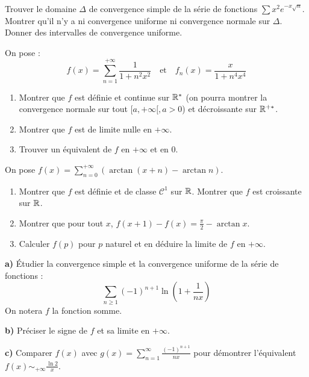 \begin{exercice}
Trouver le domaine $\Delta$ de convergence simple de la série de fonctions $\sum x^2 e^{-x\sqrt{n}}$.
Montrer qu'il n'y a ni convergence uniforme ni convergence normale sur $\Delta$.
Donner des intervalles de convergence uniforme.
\end{exercice}

\begin{exercice}
On pose :
$$ f(x) = \sum_{n=1}^{+\infty} \frac{1}{1+n^2 x^2} \quad \text{et} \quad f_n(x) = \frac{x}{1+n^4 x^4} $$
\begin{enumerate}
    \item Montrer que $f$ est définie et continue sur $\mathbb{R}^*$ (on pourra montrer la convergence normale sur tout $[a, +\infty[, a>0$) et décroissante sur $\mathbb{R}^{+*}$.
    \item Montrer que $f$ est de limite nulle en $+\infty$.
    \item Trouver un équivalent de $f$ en $+\infty$ et en $0$.
\end{enumerate}
\end{exercice}

\begin{exercice}
On pose $f(x) = \sum_{n=0}^{+\infty} (\arctan(x+n) - \arctan n)$.
\begin{enumerate}
    \item Montrer que $f$ est définie et de classe $\mathcal{C}^1$ sur $\mathbb{R}$. Montrer que $f$ est croissante sur $\mathbb{R}$.
    \item Montrer que pour tout $x$, $f(x+1) - f(x) = \frac{\pi}{2} - \arctan x$.
    \item Calculer $f(p)$ pour $p$ naturel et en déduire la limite de $f$ en $+\infty$.
\end{enumerate}
\end{exercice}

\begin{exercice}
\textbf{a)} Étudier la convergence simple et la convergence uniforme de la série de fonctions :
$$ \sum_{n\ge 1} (-1)^{n+1} \ln\left(1+\frac{1}{nx}\right) $$
On notera $f$ la fonction somme.

\textbf{b)} Préciser le signe de $f$ et sa limite en $+\infty$.

\textbf{c)} Comparer $f(x)$ avec $g(x) = \sum_{n=1}^\infty \frac{(-1)^{n+1}}{nx}$ pour démontrer l'équivalent $f(x) \sim_{+\infty} \frac{\ln 2}{x}$.
\end{exercice}

